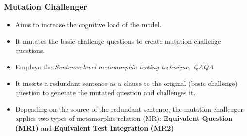 \begin{frame}
    \frametitle{Mutation Challenger}
    \begin{itemize}
        \item \footnotesize{Aims to increase the cognitive load of the model.}
        \pause
        \item \footnotesize{It mutates the basic challenge questions to
create mutation challenge questions. } \pause
        \item \footnotesize{Employs the \emph{Sentence-level metamorphic testing technique,
QAQA}}
        \pause
        \item \footnotesize{It inserts a redundant sentence as a clause
to the original (basic challenge) question to generate the mutated
question and challenges it.}
        \pause
        \item \footnotesize{Depending on the source of the redundant sentence,
the mutation challenger applies two types of metamorphic relation
(MR): \textbf{Equivalent Question (MR1)} and \textbf{Equivalent Test Integration (MR2)}}
    \end{itemize}
\end{frame}

